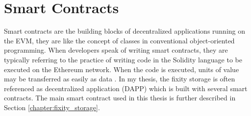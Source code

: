\section{Smart Contracts}
Smart contracts are the building blocks of decentralized applications running on the EVM, they are like the concept of classes in conventional object-oriented programming. When developers speak of writing smart contracts, they are typically referring to the practice of writing code in the Solidity language to be executed on the Ethereum network. When the code is executed, units of value may be transferred as easily as data \cite[10]{dannen2017introducing}.
In my thesis, the fixity storage is often referenced as decentralized application (DAPP) which is built with several smart contracts. The main smart contract used in this thesis is further described in Section \ref{chapter:fixity_storage}. 

